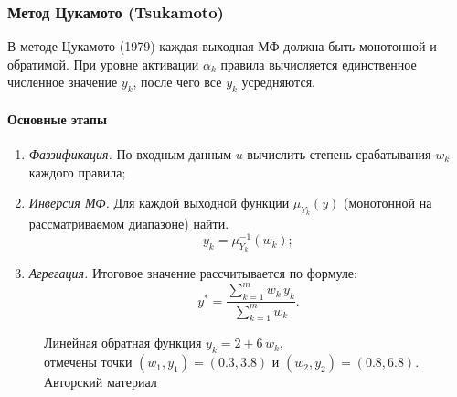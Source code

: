 \subsubsection{Метод Цукамото (Tsukamoto)}
\label{subsubsec:tsukamoto}

В методе Цукамото (1979) каждая выходная МФ должна быть монотонной и обратимой. При уровне активации $\alpha_k$ правила вычисляется единственное численное значение $y_k$, после чего все $y_k$ усредняются.

\paragraph{Основные этапы}
\begin{enumerate}
  \item \emph{Фаззификация.} По входным данным $u$ вычислить степень срабатывания $w_k$ каждого правила;
  \item \emph{Инверсия МФ.} Для каждой выходной функции $\mu_{Y_k}(y)$ (монотонной на рассматриваемом диапазоне) найти.
    \[
      y_k = \mu_{Y_k}^{-1}(w_k);
    \]
  \item \emph{Агрегация.} Итоговое значение рассчитывается по формуле:
    \[
      y^* = \frac{\sum_{k=1}^m w_k\,y_k}{\sum_{k=1}^m w_k}.
    \]
\end{enumerate}

\begin{figure}[H]
  \centering
  \caption{%
    Линейная обратная функция $y_k=2+6\,w_k$, \\
    отмечены точки $(w_1,y_1)=(0.3,3.8)$ и $(w_2,y_2)=(0.8,6.8)$. Авторский материал} 
\end{figure}

